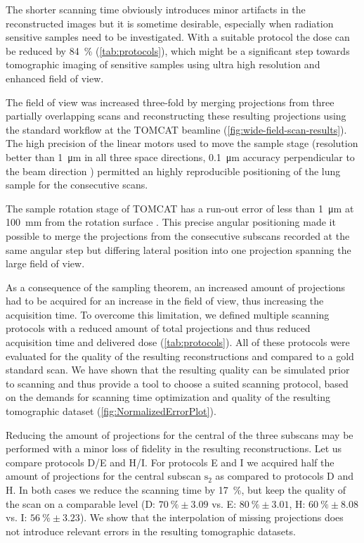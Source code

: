 The shorter scanning time obviously introduces minor artifacts in the reconstructed images but it is sometime desirable, especially when radiation sensitive samples need to be investigated. With a suitable protocol the dose can be reduced by \SI{84}{\percent} (\autoref{tab:protocols}), which might be a significant step towards tomographic imaging of sensitive samples using ultra high resolution and enhanced field of view. 

The field of view was increased three-fold by merging projections from three partially overlapping scans and reconstructing these resulting projections using the standard workflow at the TOMCAT beamline (\autoref{fig:wide-field-scan-results}). The high precision of the linear motors used to move the sample stage (resolution better than \SI{1}{\micro\meter} in all three space directions, \SI{0.1}{\micro\meter} accuracy perpendicular to the beam direction \cite{Stampanoni2006a}) permitted an highly reproducible positioning of the lung sample for the consecutive scans.

The sample rotation stage of TOMCAT has a run-out error of less than \SI{1}{\micro\meter} at \SI{100}{\milli\meter} from the rotation surface \cite{Stampanoni2006a}. This precise angular positioning made it possible to merge the projections from the consecutive subscans recorded at the same angular step but differing lateral position into one projection spanning the large field of view.

As a consequence of the sampling theorem, an increased amount of projections had to be acquired for an increase in the field of view, thus increasing the acquisition time. To overcome this limitation, we defined multiple scanning protocols with a reduced amount of total projections and thus reduced acquisition time and delivered dose (\autoref{tab:protocols}). All of these protocols were evaluated for the quality of the resulting reconstructions and compared to a gold standard scan. We have shown that the resulting quality can be simulated prior to scanning and thus provide a tool to choose a suited scanning protocol, based on the demands for scanning time optimization and quality of the resulting tomographic dataset (\autoref{fig:NormalizedErrorPlot}). 

Reducing the amount of projections for the central of the three subscans may be performed with a minor loss of fidelity in the resulting reconstructions. Let us compare protocols D/E and H/I. For protocols E and I we acquired half the amount of projections for the central subscan $\textrm{s}_{2}$ as compared to protocols D and H. In both cases we reduce the scanning time by \SI{17}{\percent}, but keep the quality of the scan on a comparable level (D: $\SI{70}{\percent}\pm3.09$ vs. E: $\SI{80}{\percent}\pm3.01$, H: $\SI{60}{\percent}\pm8.08$ vs. I: $\SI{56}{\percent}\pm3.23$).
We show that the interpolation of missing projections does not introduce relevant errors in the resulting tomographic datasets.

